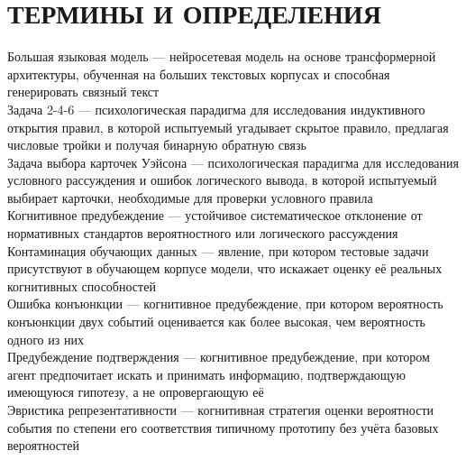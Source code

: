 \chapter*{ТЕРМИНЫ И ОПРЕДЕЛЕНИЯ}
\setlength{\parindent}{0pt}
Большая языковая модель --- нейросетевая модель на основе трансформерной архитектуры, обученная на больших текстовых корпусах и способная генерировать связный текст\\[0.5em]
Задача 2-4-6 --- психологическая парадигма для исследования индуктивного открытия правил, в которой испытуемый угадывает скрытое правило, предлагая числовые тройки и получая бинарную обратную связь\\[0.5em]
Задача выбора карточек Уэйсона --- психологическая парадигма для исследования условного рассуждения и ошибок логического вывода, в которой испытуемый выбирает карточки, необходимые для проверки условного правила\\[0.5em]
Когнитивное предубеждение --- устойчивое систематическое отклонение от нормативных стандартов вероятностного или логического рассуждения\\[0.5em]
Контаминация обучающих данных --- явление, при котором тестовые задачи присутствуют в обучающем корпусе модели, что искажает оценку её реальных когнитивных способностей\\[0.5em]
Ошибка конъюнкции --- когнитивное предубеждение, при котором вероятность конъюнкции двух событий оценивается как более высокая, чем вероятность одного из них\\[0.5em]
Предубеждение подтверждения --- когнитивное предубеждение, при котором агент предпочитает искать и принимать информацию, подтверждающую имеющуюся гипотезу, а не опровергающую её\\[0.5em]
Эвристика репрезентативности --- когнитивная стратегия оценки вероятности события по степени его соответствия типичному прототипу без учёта базовых вероятностей